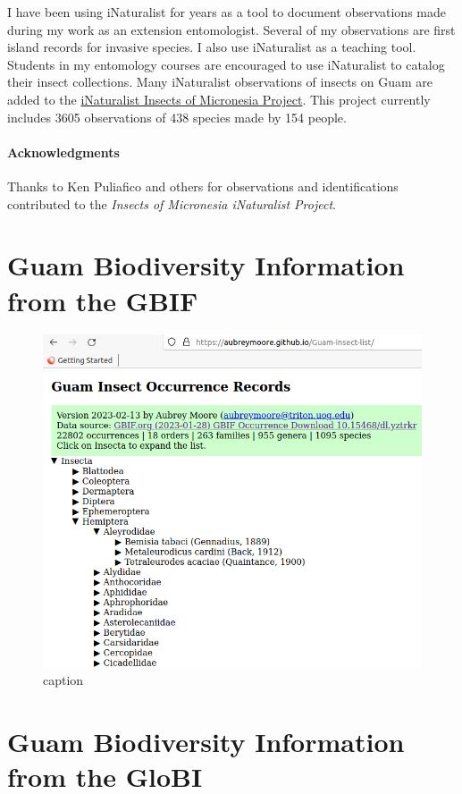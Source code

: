\documentclass[12pt,letterpaper,english,bibliography=totocnumbered, abstract=on]{scrartcl}
\begin{document}
I have been using iNaturalist for years as a tool to document observations made during my work as an extension entomologist. Several of my observations are first island records for invasive species. I also use iNaturalist as a teaching tool. Students in my entomology courses are encouraged to use iNaturalist to catalog their insect collections. Many iNaturalist observations of insects on Guam are added to the \href{https://www.inaturalist.org/projects/insects-of-micronesia}{iNaturalist Insects of Micronesia Project}. This project currently includes 3605 observations of 438 species made by 154 people. 

\paragraph{Acknowledgments} Thanks to Ken Puliafico and others for observations and identifications contributed to the \textit{Insects of Micronesia iNaturalist Project}.





\pagebreak
\section{Guam Biodiversity Information from the GBIF}

\begin{figure}[H]
	\centering
	\includegraphics[width=.7\linewidth]{images/guam-insect-occurrence-records}
	\caption{caption}
	\label{fig:guam-insect-occurrence-records}
\end{figure}

\clearpage



\pagebreak
\section{Guam Biodiversity Information from the GloBI}
\end{document}
